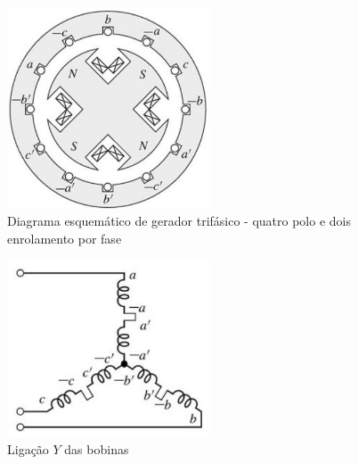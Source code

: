\documentclass[
	12pt,				%
	openright,			%
	twoside,			%
	a4paper,			%
	english,			%
	french,				%
	spanish,			%
	brazil,				%
	]{abntex2}
\begin{document}
\begin{figure}[H]
    \centering
    \includegraphics[width=6cm]{img/gerador_s_varias_bobinas.png}
    \caption{Diagrama esquemático de gerador trifásico - quatro polo e dois enrolamento por fase}
    \label{fig:gerador_b}
\end{figure}

\begin{figure}[H]
    \centering
    \includegraphics[width=6cm]{img/gerador_ligacao_estrela.png}
    \caption{Ligação $Y$ das bobinas }
    \label{fig:gerador_c}
\end{figure}
\end{document}
